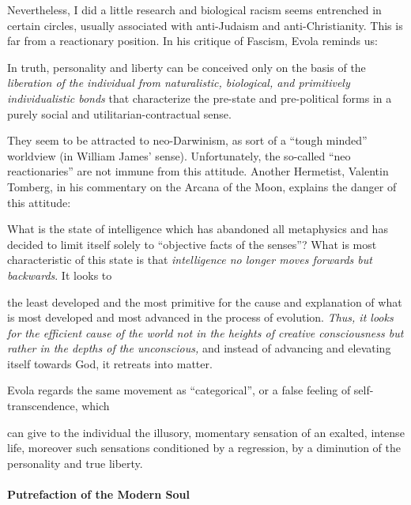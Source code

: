 Nevertheless, I did a little research and biological racism seems entrenched in certain circles, usually associated with anti-Judaism and anti-Christianity. This is far from a reactionary position. In his critique of Fascism, Evola reminds us:

\begin{quotex}
In truth, personality and liberty can be conceived only on the basis of the \emph{liberation of the individual from naturalistic, biological, and primitively individualistic bonds} that characterize the pre-state and pre-political forms in a purely social and utilitarian-contractual sense.
\end{quotex}


They seem to be attracted to neo-Darwinism, as sort of a ``tough minded'' worldview (in William James' sense). Unfortunately, the so-called ``neo reactionaries'' are not immune from this attitude. Another Hermetist, Valentin Tomberg, in his commentary on the Arcana of the Moon, explains the danger of this attitude:

\begin{quotex}
What is the state of intelligence which has abandoned all metaphysics and has decided to limit itself solely to ``objective facts of the senses''? What is most characteristic of this state is that
\emph{intelligence no longer moves forwards but backwards}. It looks to

the least developed and the most primitive for the cause and explanation of what is most developed and most advanced in the process of evolution.
\emph{Thus, it looks for the efficient cause of the world not in the heights of creative consciousness but rather in the depths of the unconscious,} and instead of advancing and elevating itself towards God, it retreats into matter.
\end{quotex}


Evola regards the same movement as ``categorical'', or a false feeling of self-transcendence, which

\begin{quotex}
can give to the individual the illusory, momentary sensation of an exalted, intense life, moreover such sensations conditioned by a regression, by a diminution of the personality and true liberty.
\end{quotex}


\paragraph{Putrefaction of the Modern Soul}


